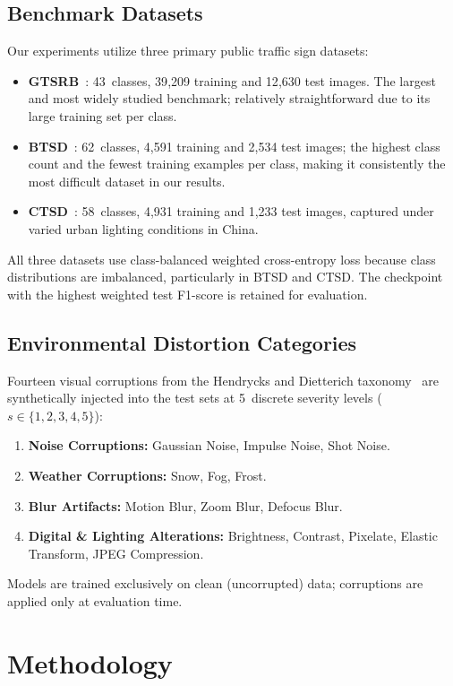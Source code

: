 \documentclass[conference]{IEEEtran}
\begin{document}
\subsection{Benchmark Datasets}
Our experiments utilize three primary public traffic sign datasets:
\begin{itemize}
    \item \textbf{GTSRB}~\cite{gtsrb}: 43~classes, 39{,}209 training and 12{,}630 test images. The largest and most widely studied benchmark; relatively straightforward due to its large training set per class.
    \item \textbf{BTSD}~\cite{btsd}: 62~classes, 4{,}591 training and 2{,}534 test images; the highest class count and the fewest training examples per class, making it consistently the most difficult dataset in our results.
    \item \textbf{CTSD}~\cite{ctsd}: 58~classes, 4{,}931 training and 1{,}233 test images, captured under varied urban lighting conditions in China.
\end{itemize}
All three datasets use class-balanced weighted cross-entropy loss because class distributions are imbalanced, particularly in BTSD and CTSD. The checkpoint with the highest weighted test F1-score is retained for evaluation.

\subsection{Environmental Distortion Categories}
Fourteen visual corruptions from the Hendrycks and Dietterich taxonomy~\cite{hendrycks2019robustness} are synthetically injected into the test sets at 5~discrete severity levels ($s \in \{1, 2, 3, 4, 5\}$):
\begin{enumerate}
    \item \textbf{Noise Corruptions:} Gaussian Noise, Impulse Noise, Shot Noise.
    \item \textbf{Weather Corruptions:} Snow, Fog, Frost.
    \item \textbf{Blur Artifacts:} Motion Blur, Zoom Blur, Defocus Blur.
    \item \textbf{Digital \& Lighting Alterations:} Brightness, Contrast, Pixelate, Elastic Transform, JPEG Compression.
\end{enumerate}
Models are trained exclusively on clean (uncorrupted) data; corruptions are applied only at evaluation time.

\section{Methodology}
\end{document}
